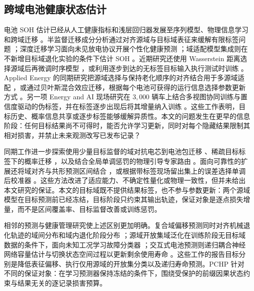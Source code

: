 \documentclass[UTF8,11pt]{ctexart}
\begin{document}
\subsection{跨域电池健康状态估计}

电池 SOH 估计已经从人工健康指标和浅层回归器发展至序列模型、物理信息学习和跨域迁移 \citep{ng2020mlbattery,roman2021pipeline,wang2024pinn}。半监督迁移成分分析通过对齐源域与目标域表征来缓解有限标签问题 \citep{li2020sstca}；深度迁移学习面向未见放电协议开展个性化健康预测 \citep{ma2022personalized}；域适配模型集成则在不新增目标域退化实验的条件下估计 SOH \citep{lu2023without}。近期研究还使用 Wasserstein 距离选择源域后再微调时序模型 \citep{duan2025wasserstein}，或利用逐步到达的无标签目标输入执行测试时训练 \citep{feng2024batteryttt}。Applied Energy 的同期研究把源域选择与保持老化顺序的对齐结合用于多源域适配 \citep{qiu2024multisource}，或通过贝叶斯混合效应迁移，根据每个电池可获得的运行信息选择参数更新方式 \citep{zhang2025bayesian}。另一项 Energy and AI 现场研究在 $3{,}000$ 辆车上结合多视图协同训练与置信度驱动的伪标签，并在标签逐步出现后将其增量纳入训练 \citep{hadzalic2025field}。这些工作表明，目标历史、概率信息共享或逐步标签能够缓解异质性。本文的问题发生在更早的信息阶段：任何目标结果尚不可得时，能否允许学习更新，同时对每个隐藏结果限制其相对损害，并禁止未来观测改写已发布记录？

同期工作进一步探索使用少量目标监督的域对抗电芯到电池包迁移 \citep{shu2026celltopack}、稀疏目标标签下的概率迁移 \citep{shao2026probabilistic}，以及结合全局单调惩罚的物理引导专家路由 \citep{jiang2026phasemoe}。面向可靠性的扩展还将域对齐与共形预测区间结合 \citep{filgueira2026conformalized}，或根据带标签现场留出集上的误差选择单调后校准器 \citep{nyachionjeka2026safecalibrated}。这些方法改进了适应能力、不确定性量化或物理一致性，但并未给出本文研究的保证。本文的目标域既不提供结果标签，也不参与参数更新：两个源域模型在目标预测前已经冻结，目标阶段只约束其输出轨迹，保证对象是逐点损失增量，而不是区间覆盖率、目标监督改善或训练惩罚。

相邻的预测与健康管理研究使上述区别更加明确。复合域偏移预测同时对齐机械退化轨迹的域间分布和域内退化阶段分布 \citep{ding2023compound}；源域开放集域泛化在训练阶段无目标域数据的条件下，面向未知工况学习故障分类器 \citep{song2026regroupment}；交互式电池预测则递归耦合神经网络容量估计与切换状态空间过程以更新剩余使用寿命 \citep{duan2025interactive}。这些工作的报告目标分别是降低表征偏移、执行仅用源域的开放集分类以及递归寿命预测。PCHP 针对不同的保证对象：在学习预测器保持冻结的条件下，围绕受保护的前缀因果状态约束与结果无关的逐记录损害预算。
\end{document}
